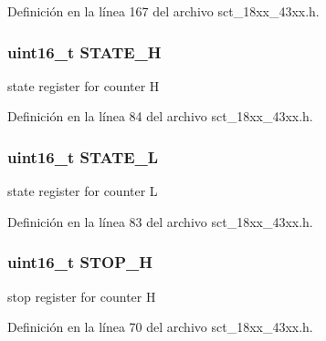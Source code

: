 Definición en la línea 167 del archivo sct\+\_\+18xx\+\_\+43xx.\+h.

\subsubsection[{\texorpdfstring{S\+T\+A\+T\+E\+\_\+H}{STATE_H}}]{ uint16\+\_\+t S\+T\+A\+T\+E\+\_\+H}\hypertarget{struct_l_p_c___s_c_t___t_a9c306018d51f98376b2b9ff312912d25}{}\label{struct_l_p_c___s_c_t___t_a9c306018d51f98376b2b9ff312912d25}
state register for counter H 

Definición en la línea 84 del archivo sct\+\_\+18xx\+\_\+43xx.\+h.

\subsubsection[{\texorpdfstring{S\+T\+A\+T\+E\+\_\+L}{STATE_L}}]{ uint16\+\_\+t S\+T\+A\+T\+E\+\_\+L}\hypertarget{struct_l_p_c___s_c_t___t_aafd18efed563326a1ee6d22e5b6f3796}{}\label{struct_l_p_c___s_c_t___t_aafd18efed563326a1ee6d22e5b6f3796}
state register for counter L 

Definición en la línea 83 del archivo sct\+\_\+18xx\+\_\+43xx.\+h.

\subsubsection[{\texorpdfstring{S\+T\+O\+P\+\_\+H}{STOP_H}}]{ uint16\+\_\+t S\+T\+O\+P\+\_\+H}\hypertarget{struct_l_p_c___s_c_t___t_a464abb2cf02321f29b7294c6132014c1}{}\label{struct_l_p_c___s_c_t___t_a464abb2cf02321f29b7294c6132014c1}
stop register for counter H 

Definición en la línea 70 del archivo sct\+\_\+18xx\+\_\+43xx.\+h.

